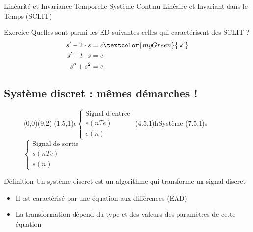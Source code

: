 \documentclass[a4paper,11pt]{beamer}
\newcounter{exampleBlockCounter}
\begin{document}
\begin{frame}
\begin{alertblock}{Linéarité et Invariance Temporelle}
\center
Système Continu Linéaire et Invariant dans le Temps (SCLIT) 
\end{alertblock}
\begin{exampleblock}{Exercice }
\justifying
Quelles sont parmi les ED suivantes celles qui caractérisent des SCLIT ?
\setcounter{equation}{0}
\begin{align}
  s' - 2 \cdot s &= e \textcolor{myGreen}{\:\checkmark}\\
  s' + t \cdot s &= e\\
  s'' + s^2 &= e
\end{align}
\end{exampleblock}
\end{frame}

\subsection{Système discret : mêmes démarches !} 

\begin{frame}

\begin{figure}
	\begin{pspicture}[showgrid=false](0,0)(9,2)
		\pssignal(1.5,1){e}{$\begin{cases}
		\text{Signal d'entrée}\\
		e(nTe)\\
		e(n)
		\end{cases}$}
		\psfblock[framesize=1.75 1.65](4.5,1){h}{Système}
		\pssignal(7.5,1){s}{$\begin{cases}
		\text{Signal de sortie}\\
		s(nTe)\\
		s(n)
		\end{cases}$}
	\end{pspicture}
\end{figure}
\begin{block}{Définition}
\centering
Un système discret est un algorithme qui transforme un signal discret
\end{block}
\begin{itemize}
\justifying
  \item Il est caractérisé par une équation aux différences (EAD)
  \item La transformation dépend du type et des valeurs des paramètres de
  cette équation
\end{itemize}
\end{frame}
\end{document}
